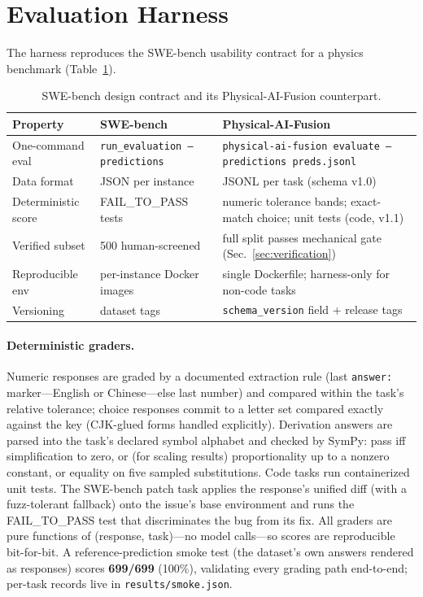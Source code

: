 \section{Evaluation Harness}
\label{sec:harness}

The harness reproduces the SWE-bench usability contract for a physics benchmark (Table~\ref{tab:swebench}).

\begin{table}[t]
\centering
\caption{SWE-bench design contract and its Physical-AI-Fusion counterpart.}
\label{tab:swebench}
\small
\begin{tabular}{@{}p{3.6cm}p{4.4cm}p{5.2cm}@{}}
\toprule
Property & SWE-bench & Physical-AI-Fusion \\
\midrule
One-command eval & \texttt{run\_evaluation --predictions} & \texttt{physical-ai-fusion evaluate --predictions preds.jsonl} \\
Data format & JSON per instance & JSONL per task (schema v1.0) \\
Deterministic score & FAIL\_TO\_PASS tests & numeric tolerance bands; exact-match choice; unit tests (code, v1.1) \\
Verified subset & 500 human-screened & full split passes mechanical gate (Sec.~\ref{sec:verification}) \\
Reproducible env & per-instance Docker images & single Dockerfile; harness-only for non-code tasks \\
Versioning & dataset tags & \texttt{schema\_version} field + release tags \\
\bottomrule
\end{tabular}
\end{table}

\paragraph{Deterministic graders.}
Numeric responses are graded by a documented extraction rule (last \texttt{answer:} marker---English or Chinese---else last number) and compared within the task's relative tolerance; choice responses commit to a letter set compared exactly against the key (CJK-glued forms handled explicitly). Derivation answers are parsed into the task's declared symbol alphabet and checked by SymPy: pass iff simplification to zero, or (for scaling results) proportionality up to a nonzero constant, or equality on five sampled substitutions. Code tasks run containerized unit tests. The SWE-bench patch task applies the response's unified diff (with a fuzz-tolerant fallback) onto the issue's base environment and runs the FAIL\_TO\_PASS test that discriminates the bug from its fix. All graders are pure functions of (response, task)---no model calls---so scores are reproducible bit-for-bit. A reference-prediction smoke test (the dataset's own answers rendered as responses) scores \textbf{699/699} (100\%), validating every grading path end-to-end; per-task records live in \texttt{results/smoke.json}.

